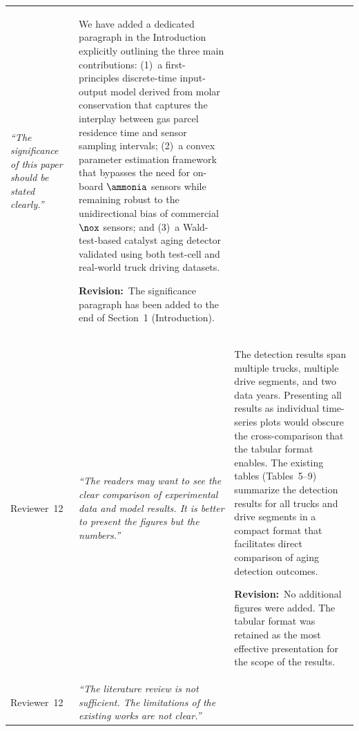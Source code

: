 \documentclass[letterpaper, 10pt]{article}
\newcommand{\rquote}[1]{\textcolor{reviewtext}{\emph{#1}}}
\newcommand{\revision}[1]{\par\smallskip\textcolor{revisioncolor}{\textbf{Revision:}~#1}}
\begin{document}
\begin{longtable}{
    >{\raggedright\arraybackslash\small}p{}
    >{\small}p{}
    >{\small}p{}}
    \rquote{``The significance of this paper should be stated clearly.''}
                               &
    We have added a dedicated paragraph in the Introduction explicitly outlining the three main contributions:
    (1)~a first-principles discrete-time input-output model derived from molar conservation that captures the interplay
    between gas parcel residence time and sensor sampling intervals;
    (2)~a convex parameter estimation framework that bypasses the need for on-board $\ammonia$ sensors while remaining
    robust to the unidirectional bias of commercial $\nox$ sensors; and
    (3)~a Wald-test-based catalyst aging detector validated using both test-cell and real-world truck driving datasets.
    \revision{The significance paragraph has been added to the end of Section~1 (Introduction).}
    \\ \arrayrulecolor{rowsep}\midrule\arrayrulecolor{black}
    Reviewer~12
                               &
    \rquote{``The readers may want to see the clear comparison of experimental data and model results. It is better to
        present the figures but the numbers.''}
                               &
    The detection results span multiple trucks, multiple drive segments, and two
    data years. Presenting all results as individual time-series plots would obscure the cross-comparison that the tabular format enables. The existing tables (Tables~5--9) summarize the detection results for all trucks and drive segments in a compact format that facilitates direct comparison of aging detection outcomes.
    \revision{No additional figures were added. The tabular format was retained as the most effective presentation for
        the scope of the results.}
    \\ \arrayrulecolor{rowsep}\midrule\arrayrulecolor{black}
    Reviewer~12
                               &
    \rquote{``The literature review is not sufficient. The limitations of the existing works are not clear.''}
                               &

\end{longtable}
\end{document}
